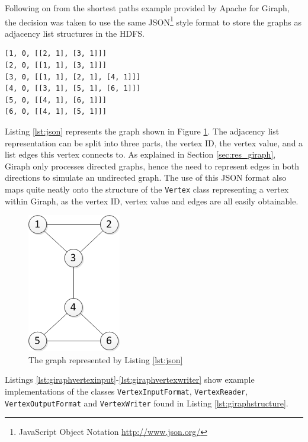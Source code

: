 Following on from the shortest paths example \cite{giraphexample} provided by Apache for Giraph, the decision was taken to use the same JSON\footnote{JavaScript Object Notation \url{http://www.json.org/}} style format to store the graphs as adjacency list structures in the HDFS.

\begin{lstlisting}[float]
[1, 0, [[2, 1], [3, 1]]]
[2, 0, [[1, 1], [3, 1]]]
[3, 0, [[1, 1], [2, 1], [4, 1]]]
[4, 0, [[3, 1], [5, 1], [6, 1]]]
[5, 0, [[4, 1], [6, 1]]]
[6, 0, [[4, 1], [5, 1]]]
\end{lstlisting}

Listing \ref{lst:json} represents the graph shown in Figure \ref{fig:json}. The adjacency list representation can be split into three parts, the vertex ID, the vertex value, and a list edges this vertex connects to. As explained in Section \ref{sec:res_giraph}, Giraph only processes directed graphs, hence the need to represent edges in both directions to simulate an undirected graph. The use of this JSON format also maps quite neatly onto the structure of the \verb/Vertex/ class representing a vertex within Giraph, as the vertex ID, vertex value and edges are all easily obtainable.

\begin{figure}[htbp]
  \centering
    \includegraphics{./img/json}
  \caption{The graph represented by Listing \ref{lst:json}}
  \label{fig:json}
\end{figure}

Listings \ref{lst:giraphvertexinput}-\ref{lst:giraphvertexwriter} show example implementations of the classes {\tt VertexInputFormat}, {\tt VertexReader}, {\tt VertexOutputFormat} and {\tt VertexWriter} found in Listing \ref{lst:giraphstructure}.


